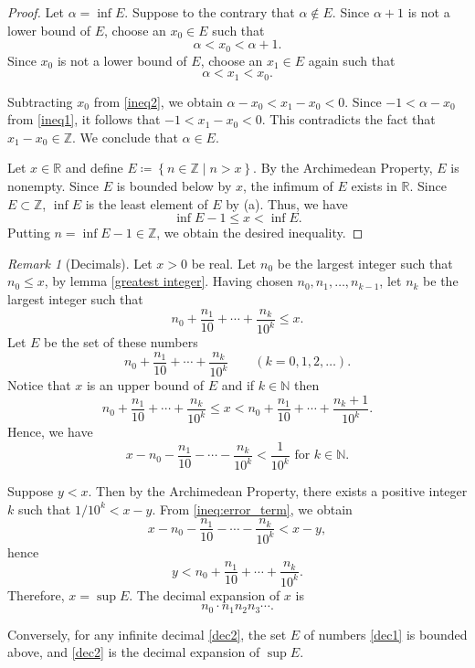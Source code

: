 \documentclass[11pt]{article}
\theoremstyle{definition}
\theoremstyle{plain}
\theoremstyle{remark}
\newtheorem{remark}[definition]{Remark}
\newcommand{\N}{\mathbb{N}}
\newcommand{\Z}{\mathbb{Z}}
\newcommand{\R}{\mathbb{R}}
\begin{document}
\begin{proof}
\item[(a)] Let $\alpha = \inf E$.
Suppose to the contrary that $\alpha \notin E$. 
Since $\alpha+1$ is not a lower bound of $E$, choose an $x_0 \in E$ such that 
\begin{equation}\label{ineq1}
    \alpha<x_0<\alpha+1.
\end{equation}
Since $x_0$ is not a lower bound of $E$, choose an $x_1 \in E$ again such that
\begin{equation}\label{ineq2}
    \alpha<x_1<x_0.
\end{equation}

Subtracting $x_0$ from \eqref{ineq2}, we obtain $\alpha-x_0<x_1-x_0<0$. 
Since $-1<\alpha-x_0$ from \eqref{ineq1}, it follows that $-1<x_1-x_0<0$.
This contradicts the fact that $x_1-x_0 \in \Z$.
We conclude that $\alpha \in E$.
\item[(b)] Let $x \in \R$ and define $E \coloneqq \left\{n \in \Z \mid n>x \right\}$.
By the Archimedean Property, $E$ is nonempty. 
Since $E$ is bounded below by $x$, the infimum of $E$ exists in $\R$. 
Since $E \subset \Z$, $\inf E$ is the least element of $E$ by (a).
Thus, we have \[\inf E -1 \leq x < \inf E.\]
Putting $n= \inf E -1 \in \Z$, we obtain the desired inequality.
\end{proof}
\begin{remark}[Decimals]
Let $x>0$ be real. 
Let $n_0$ be the largest integer such that $n_0 \leq x$, by lemma \ref{greatest integer}.
Having chosen $n_0, n_1, \ldots, n_{k-1}$, let $n_k$ be the largest integer such that 
\[
n_0 + \frac{n_1}{10} + \cdots + \frac{n_k}{10^k} \leq x.
\]
Let $E$ be the set of these numbers 
\begin{equation} \label{dec1}
n_0 + \frac{n_1}{10} + \cdots + \frac{n_k}{10^k} \qquad (k=0, 1, 2, \ldots).
\end{equation}
Notice that $x$ is an upper bound of $E$ and if $k \in \N$ then
\[
n_0 + \frac{n_1}{10} + \cdots + \frac{n_k}{10^k} \leq x < n_0 + \frac{n_1}{10} + \cdots + \frac{n_k+1}{10^k}.
\]
Hence, we have
\begin{equation} \label{ineq:error_term}
x - n_0 - \frac{n_1}{10} - \cdots - \frac{n_k}{10^k} < \frac{1}{10^k} \text{ for } k  \in \N.
\end{equation}

Suppose $y<x$. Then by the Archimedean Property, there exists a positive integer $k$ such that $1/10^k<x-y$.
From \eqref{ineq:error_term}, we obtain 
\[
x - n_0 - \frac{n_1}{10} - \cdots - \frac{n_k}{10^k}<x-y,
\]
hence 
\[
y<n_0 + \frac{n_1}{10} + \cdots + \frac{n_k}{10^k}.
\]
Therefore, $x=\sup E$. The decimal expansion of $x$ is 
\begin{equation} \label{dec2}
n_0 \cdot n_1 n_2 n_3 \cdots .
\end{equation}

Conversely, for any infinite decimal \eqref{dec2}, the set $E$ of numbers \eqref{dec1} is bounded above, and \eqref{dec2} is the decimal expansion of $\sup E$.
\end{remark}
\end{document}
